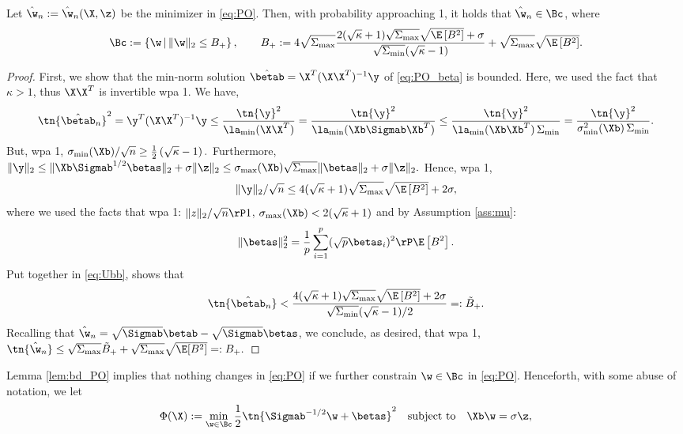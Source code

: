 \begin{lemma}\label{lem:bd_PO}
Let $\hat\w_n:=\hat\w_n(\X,\z)$ be the minimizer in \eqref{eq:PO}. Then, with probability approaching 1, it holds that $\hat\w_n\in\Bc$, where
$$\Bc:=\left\{\w\,|\,\|\w\|_2\leq B_{+} \right\},\qquad B_+:=4\sqrt{\Sigma_{\max}}\frac{2(\sqrt{\kappa}+1)\sqrt{\Sigma_{\max}} \sqrt{\E\left[B^2\right]} + \sigma}{\sqrt{\Sigma_{\min}}(\sqrt{\kappa}-1)} + \sqrt{\Sigma_{\max}}\sqrt{\E\left[B^2\right]}.
$$ 
\end{lemma}
\begin{proof}
First, we show that the min-norm solution $\hat\betab=\X^T(\X\X^T)^{-1}\y$ of \eqref{eq:PO_beta} is bounded. Here, we used the fact that $\kappa>1$, thus $\X\X^T$ is invertible wpa 1. We
have,
\begin{align}
\tn{\hat\betab_n}^2 = \y^T(\X\X^T)^{-1}\y \leq \frac{\tn{\y}^2}{\la_{\min}(\X\X^T)}  = \frac{\tn{\y}^2}{\la_{\min}(\Xb\Sigmab\Xb^T)} \leq  \frac{\tn{\y}^2}{\la_{\min}(\Xb\Xb^T)\,\Sigma_{\min}} = \frac{\tn{\y}^2}{\sigma_{\min}^2(\Xb)\,\Sigma_{\min}}. \label{eq:Ubb}
\end{align}
But, wpa 1, 
$
\sigma_{\min}(\Xb)/\sqrt{n} \geq \frac{1}{2}\left(\sqrt{\kappa}-1\right).
$
Furthermore, 
$
\|\y\|_2 \leq \|\Xb\Sigmab^{1/2}\betas\|_2 + \sigma\|\z\|_2 \leq \sigma_{\max}(\Xb)\sqrt{\Sigma_{\max}} \|\betas\|_2 + \sigma\|\z\|_2.
$
Hence, wpa 1,
$$
\|\y\|_2/\sqrt{n} \leq 4(\sqrt{\kappa}+1)\sqrt{\Sigma_{\max}} \sqrt{\E\left[B^2\right]} + 2\sigma,
$$
where we used the facts that wpa 1: $\|z\|_2/\sqrt{n}\rP 1$, $\sigma_{\max}(\Xb)<2(\sqrt{\kappa}+1)$ and by Assumption \ref{ass:mu}:
$$
\|\betas\|_2^2 = \frac{1}{p}\sum_{i=1}^{p}(\sqrt{p}\betas_i)^2 \rP \E\left[B^2\right].
$$
Put together in \eqref{eq:Ubb}, shows that
\begin{align}
\tn{\hat\betab_n} < \frac{4(\sqrt{\kappa}+1)\sqrt{\Sigma_{\max}} \sqrt{\E\left[B^2\right]} + 2\sigma}{\sqrt{\Sigma_{\min}}(\sqrt{\kappa}-1)/2} =: \tilde{B}_+.\label{eq:bd_beta}
\end{align}
Recalling that $\hat\w_n= \sqrt{\Sigmab}\betab - \sqrt{\Sigmab}\betas$, we conclude, as desired, that wpa 1,
$
\tn{\hat\w_n} \leq \sqrt{\Sigma_{\max}}\tilde{B}_+ + \sqrt{\Sigma_{\max}} \sqrt{\E[B^2]} =: B_+.
$
\end{proof}

Lemma \ref{lem:bd_PO} implies that nothing changes in \eqref{eq:PO} if we further constrain $\w\in\Bc$ in \eqref{eq:PO}. Henceforth, with some abuse of notation, we let
\begin{align}\label{eq:PO_bd}
\Phi(\X):=\min_{\w\in\Bc} \frac{1}{2}\tn{\Sigmab^{-1/2}\w+\betas}^2\quad\text{subject to}\quad \Xb\w=\sigma \z,
\end{align}

